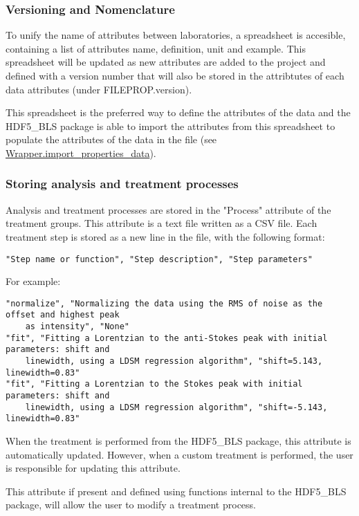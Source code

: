 \subsubsection*{Versioning and Nomenclature}
    To unify the name of attributes between laboratories, a spreadsheet is accesible, containing a list of attributes name, definition, unit and example. This spreadsheet will be updated as new attributes are added to the project and defined with a version number that will also be stored in the attribtutes of each data attributes (under FILEPROP.version). 
    
    This spreadsheet is the preferred way to define the attributes of the data and the HDF5\_BLS package is able to import the attributes from this spreadsheet to populate the attributes of the data in the file (see \hyperref[subsec:wrapper.import_properties_data]{Wrapper.import\_properties\_data}).
    
\subsubsection*{Storing analysis and treatment processes}

    Analysis and treatment processes are stored in the "Process" attribute of the treatment groups. This attribute is a text file written as a CSV file. Each treatment step is stored as a new line in the file, with the following format:
    \begin{verbatim}
"Step name or function", "Step description", "Step parameters"
    \end{verbatim}

    For example:
    \begin{verbatim}
"normalize", "Normalizing the data using the RMS of noise as the offset and highest peak 
    as intensity", "None"
"fit", "Fitting a Lorentzian to the anti-Stokes peak with initial parameters: shift and 
    linewidth, using a LDSM regression algorithm", "shift=5.143, linewidth=0.83"
"fit", "Fitting a Lorentzian to the Stokes peak with initial parameters: shift and 
    linewidth, using a LDSM regression algorithm", "shift=-5.143, linewidth=0.83"
    \end{verbatim}

    When the treatment is performed from the HDF5\_BLS package, this attribute is automatically updated. However, when a custom treatment is performed, the user is responsible for updating this attribute.

    This attribute if present and defined using functions internal to the HDF5\_BLS package, will allow the user to modify a treatment process.
    